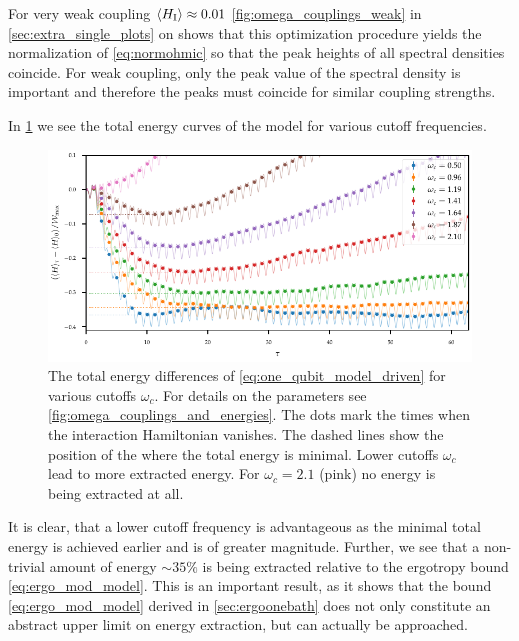 For very weak coupling \(\ev{H_{\inter}}\approx 0.01\)
\cref{fig:omega_couplings_weak} in \cref{sec:extra_single_plots} on
 shows that this optimization
procedure yields the normalization of \cref{eq:normohmic} so that the
peak heights of all spectral densities coincide. For weak coupling,
only the peak value of the spectral density is important and therefore
the peaks must coincide for similar coupling strengths.

In \cref{fig:omegas_total} we see the total energy curves of the model
for various cutoff frequencies.
\begin{figure}[htp]
  \centering
  \includegraphics{figs/one_bath_mod/omegas_total}
  \caption{\label{fig:omegas_total} The total energy differences of
    \cref{eq:one_qubit_model_driven} for various cutoffs
    \(ω_{c}\). For details on the parameters see
    \cref{fig:omega_couplings_and_energies}. The dots mark the times
    when the interaction Hamiltonian vanishes.  The dashed lines show the
    position of the where the total energy is minimal. Lower cutoffs
    \(ω_{c}\) lead to more extracted energy. For \(ω_{c}=2.1\) (pink) no
    energy is being extracted at all.}
\end{figure}
It is clear, that a lower cutoff frequency is advantageous as the
minimal total energy is achieved earlier and is of greater
magnitude. Further, we see that a non-trivial amount of energy
\(\sim 35\%\) is being extracted relative to the ergotropy bound
\cref{eq:ergo_mod_model}. This is an important result, as it shows
that the bound \cref{eq:ergo_mod_model} derived in
\cref{sec:ergoonebath} does not only constitute an abstract upper
limit on energy extraction, but can actually be approached.

